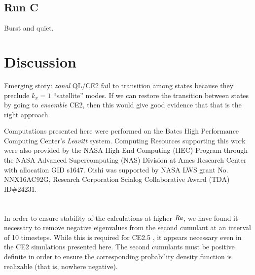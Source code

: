 \documentclass{jfm}
\newcommand{\Rayleigh}{\mbox{\textit{Ra}}}  %
\begin{document}
\subsection{Run C}
\label{sec:run_c_dns_ce2}

Burst and quiet.

\section{Discussion}
\label{sec:discussion}

Emerging story: \emph{zonal} QL/CE2 fail to transition among states because they preclude $k_x = 1$ ``satellite'' modes. If we can restore the transition between states by going to \emph{ensemble} CE2, then this would give good evidence that that is the right approach.


Computations presented here were performed on the Bates High Performance Computing Center's \emph{Leavitt} system.
Computing Resources supporting this work were also provided by the NASA High-End Computing (HEC) Program through the NASA Advanced Supercomputing (NAS) Division at Ames Research Center with allocation GID s1647.
Oishi was supported by NASA LWS grant No. NNX16AC92G, Research Corporation Scialog Collaborative Award (TDA) ID\#24231.


\appendix
\section{}\label{appA}
In order to ensure stability of the calculations at higher $\Rayleigh$, we have found it necessary to remove negative eigenvalues from the second cumulant at an interval of 10 timesteps.
While this is required for CE2.5 \citep{marston_qi_tobias_2019}, it appears necessary even in the CE2 simulations presented here.
The second cumulants must be positive definite in order to ensure the corresponding probability density function is realizable (that is, nowhere negative).




\end{document}
